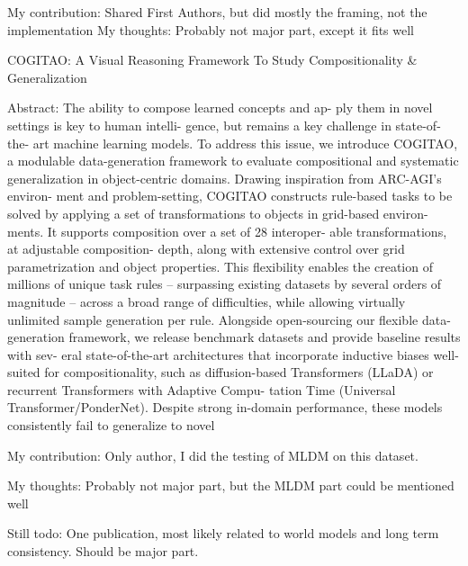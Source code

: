 My contribution: Shared First Authors, but did mostly the framing, not the implementation
My thoughts: Probably not major part, except it fits well



COGITAO: A Visual Reasoning Framework To Study Compositionality & Generalization

Abstract: The ability to compose learned concepts and ap-
ply them in novel settings is key to human intelli-
gence, but remains a key challenge in state-of-the-
art machine learning models.
To address this issue, we introduce COGITAO, a
modulable data-generation framework to evaluate
compositional and systematic generalization in
object-centric domains.
Drawing inspiration from ARC-AGI’s environ-
ment and problem-setting, COGITAO constructs
rule-based tasks to be solved by applying a set of
transformations to objects in grid-based environ-
ments.
It supports composition over a set of 28 interoper-
able transformations, at adjustable composition-
depth, along with extensive control over grid
parametrization and object properties.
This flexibility enables the creation of millions of
unique task rules – surpassing existing datasets by
several orders of magnitude – across a broad range
of difficulties, while allowing virtually unlimited
sample generation per rule.
Alongside open-sourcing our flexible data-
generation framework, we release benchmark
datasets and provide baseline results with sev-
eral state-of-the-art architectures that incorporate
inductive biases well-suited for compositionality,
such as diffusion-based Transformers (LLaDA)
or recurrent Transformers with Adaptive Compu-
tation Time (Universal Transformer/PonderNet).
Despite strong in-domain performance, these
models consistently fail to generalize to novel


My contribution: Only author, I did the testing of MLDM on this dataset.

My thoughts: Probably not major part, but the MLDM part could be mentioned well





Still todo: One publication, most likely related to world models and long term consistency. Should be major part.



